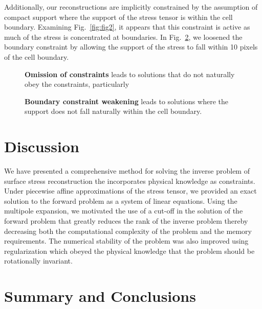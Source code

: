 \documentclass[aps,prl,reprint,twocolumn,groupedaddress,showpacs]{revtex4-1}
\begin{document}
Additionally, our reconstructions are implicitly constrained by the assumption of compact support where
the support of the stress tensor is within the cell boundary. Examining Fig.~\ref{fig:fig2}, it appears that 
this constraint is active as much of the stress is concentrated at boundaries. In Fig.~\ref{fig:fig4}, we 
loosened the boundary constraint by allowing the support of the stress to fall within 10 pixels of the cell boundary. 

\begin{figure}
\caption{\textbf{Omission of constraints} leads to solutions that do not naturally obey the constraints, particularly }
\label{fig:fig3}
\end{figure}

\begin{figure}
\caption{\textbf{Boundary constraint weakening} leads to solutions where the support does not fall naturally within the cell boundary. }
\label{fig:fig4}
\end{figure}

\section{Discussion}

We have presented a comprehensive method for solving the inverse problem of surface stress
reconstruction the incorporates physical knowledge as constraints.  Under piecewise affine approximations
of the stress tensor, we provided an exact solution to the forward problem as a system of
linear equations. Using the multipole expansion, we motivated the use of a cut-off in the solution of the forward problem that greatly reduces the rank of the inverse problem thereby decreasing both
the computational complexity of the problem and the memory requirements. The numerical stability
of the problem was also improved using regularization which obeyed the physical knowledge that
the problem should be rotationally invariant.

\section{Summary and Conclusions}

\appendix
\end{document}

